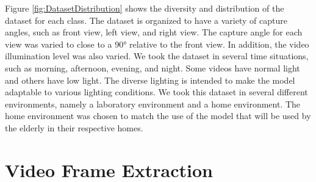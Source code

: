 Figure \ref{fig:DatasetDistribution} shows the diversity and distribution of the dataset for each class. The dataset is organized to have a variety of capture angles, such as front view, left view, and right view. The capture angle for each view was varied to close to a \ang{90} relative to the front view. In addition, the video illumination level was also varied. We took the dataset in several time situations, such as morning, afternoon, evening, and night. Some videos have normal light and others have low light. The diverse lighting is intended to make the model adaptable to various lighting conditions. We took this dataset in several different environments, namely a laboratory environment and a home environment. The home environment was chosen to match the use of the model that will be used by the elderly in their respective homes.



\section{Video Frame Extraction}
\label{se4:VIdeoExtraction}

